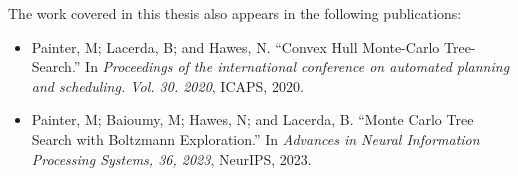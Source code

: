     The work covered in this thesis also appears in the following publications:
    \begin{itemize}
        \item Painter, M; Lacerda, B; and Hawes, N. ``Convex Hull Monte-Carlo Tree-Search.'' In \textit{Proceedings of the international conference on automated planning and scheduling. Vol. 30. 2020}, ICAPS, 2020.
        \item Painter, M; Baioumy, M; Hawes, N; and Lacerda, B.  ``Monte Carlo Tree Search with Boltzmann Exploration.'' In \textit{Advances in Neural Information Processing Systems, 36, 2023}, NeurIPS, 2023.
    \end{itemize}











